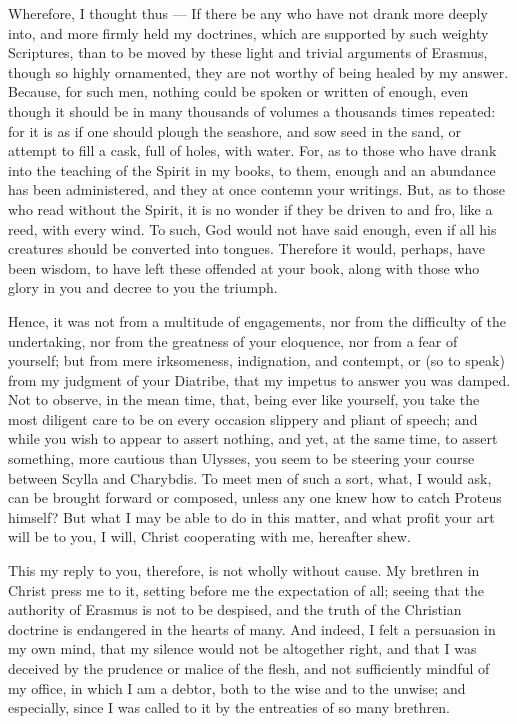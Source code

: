 Wherefore, I thought thus — If there be any who have not drank more deeply into, and more firmly held my doctrines, which are supported by such weighty Scriptures, than to be moved by these light and trivial arguments of Erasmus, though so highly ornamented, they are not worthy of being healed by my answer. Because, for such men, nothing could be spoken or written of enough, even though it should be in many thousands of volumes a thousands times repeated: for it is as if one should plough the seashore, and sow seed in the sand, or attempt to fill a cask, full of holes, with water. For, as to those who have drank into the teaching of the Spirit in my books, to them, enough and an abundance has been administered, and they at once contemn your writings. But, as to those who read without the Spirit, it is no wonder if they be driven to and fro, like a reed, with every wind. To such, God would not have said enough, even if all his creatures should be converted into tongues. Therefore it would, perhaps, have been wisdom, to have left these offended at your book, along with those who glory in you and decree to you the triumph.

Hence, it was not from a multitude of engagements, nor from the difficulty of the undertaking, nor from the greatness of your eloquence, nor from a fear of yourself; but from mere irksomeness, indignation, and contempt, or (so to speak) from my judgment of your Diatribe, that my impetus to answer you was damped. Not to observe, in the mean time, that, being ever like yourself, you take the most diligent care to be on every occasion slippery and pliant of speech; and while you wish to appear to assert nothing, and yet, at the same time, to assert something, more cautious than Ulysses, you seem to be steering your course between Scylla and Charybdis. To meet men of such a sort, what, I would ask, can be brought forward or composed, unless any one knew how to catch Proteus himself? But what I may be able to do in this matter, and what profit your art will be to you, I will, Christ cooperating with me, hereafter shew.

This my reply to you, therefore, is not wholly without cause. My brethren in Christ press me to it, setting before me the expectation of all; seeing that the authority of Erasmus is not to be despised, and the truth of the Christian doctrine is endangered in the hearts of many. And indeed, I felt a persuasion in my own mind, that my silence would not be altogether right, and that I was deceived by the prudence or malice of the flesh, and not sufficiently mindful of my office, in which I am a debtor, both to the wise and to the unwise; and especially, since I was called to it by the entreaties of so many brethren.

